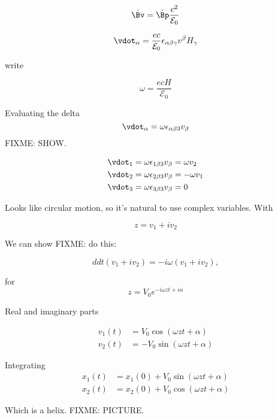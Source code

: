 \begin{equation}\label{eqn:relativisticElectrodynamicsT3:640}
\dot{\Bv} = \dot{\Bp} \frac{c^2}{\mathcal{E}_0}
\end{equation}

\begin{equation}\label{eqn:relativisticElectrodynamicsT3:660}
\vdot_\alpha = \frac{e c}{\mathcal{E}_0} \epsilon_{\alpha \beta \gamma} v^\beta H_\gamma
\end{equation}

write

\begin{equation}\label{eqn:relativisticElectrodynamicsT3:680}
\omega = \frac{e c H}{\mathcal{E}_0}
\end{equation}

Evaluating the delta 
\begin{equation}\label{eqn:relativisticElectrodynamicsT3:700}
\vdot_\alpha = \omega \epsilon_{\alpha \beta 3} v_\beta 
\end{equation}
FIXME: SHOW.

\begin{align}\label{eqn:relativisticElectrodynamicsT3:720}
\vdot_1 &= \omega \epsilon_{1 \beta 3} v_\beta = \omega v_2 \\
\vdot_2 &= \omega \epsilon_{2 \beta 3} v_\beta = - \omega v_1 \\
\vdot_3 &= \omega \epsilon_{3 \beta 3} v_\beta = 0
\end{align}

Looks like circular motion, so it's natural to use complex variables.  With

\begin{equation}\label{eqn:relativisticElectrodynamicsT3:740}
z = v_1 + i v_2 
\end{equation}

We can show
FIXME: do this:

\begin{equation}\label{eqn:relativisticElectrodynamicsT3:760}
ddt ( v_1 + i v_2 ) = -i \omega ( v_1 + i v_2 ),
\end{equation}

for
\begin{equation}\label{eqn:relativisticElectrodynamicsT3:780}
z = V_0 e^{-i \omega z t + i \alpha}
\end{equation}

Real and imaginary parts

\begin{align}\label{eqn:relativisticElectrodynamicsT3:800}
v_1(t) &= V_0 \cos( \omega z t + \alpha) \\
v_2(t) &= -V_0 \sin( \omega z t + \alpha)
\end{align}

Integrating
\begin{align}\label{eqn:relativisticElectrodynamicsT3:820}
x_1(t) &= x_1(0) + V_0 \sin( \omega z t + \alpha) \\
x_2(t) &= x_2(0) + V_0 \cos( \omega z t + \alpha)
\end{align}

Which is a helix.
FIXME: PICTURE.

\EndNoBibArticle
